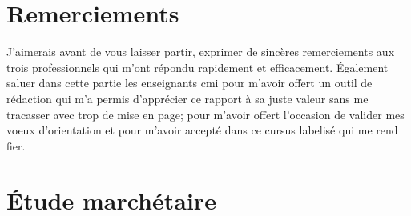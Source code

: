 \documentclass[12pt, a4paper]{report} %
\begin{document}
\chapter*{Remerciements}
J'aimerais avant de vous laisser partir, exprimer de sincères remerciements aux trois professionnels qui m'ont répondu rapidement et efficacement. Également saluer dans cette partie les enseignants \acrshort{cmi} pour m'avoir offert un outil de rédaction qui m'a permis d'apprécier ce rapport à sa juste valeur sans me tracasser avec trop de mise en page; pour m'avoir offert l'occasion de valider mes voeux d'orientation et pour m'avoir accepté dans ce cursus labelisé qui me rend fier.


\appendix
\label{appendix}
\chapter{Étude marchétaire}
\newpage 
{}


\renewcommand{\bibname}{Sitographie}

\printglossary[title=List of Terms,toctitle=Termes et abréviations]
\label{glos}
\tableofcontents %
\end{document}
